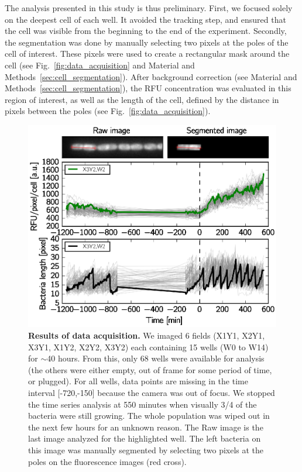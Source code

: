 The analysis presented in this study is thus preliminary.
First, we focused solely on the deepest cell of each well.
It avoided the tracking step, and ensured that the cell was visible from the beginning to the end of the experiment.
Secondly, the segmentation was done by manually selecting two pixels at the poles of the cell of interest.
These pixels were used to create a rectangular mask around the cell (see Fig.~\ref{fig:data_acquisition} and Material and Methods~\ref{sec:cell_segmentation}).
After background correction (see Material and Methods~\ref{sec:cell_segmentation}), the RFU concentration was evaluated in this region of interest, as well as the length of the cell, defined by the distance in pixels between the poles (see Fig.~\ref{fig:data_acquisition}).

\begin{figure}[p]
\centering
\includegraphics[scale=1]{./Fig/data_acquisition}
\caption{
\textbf{Results of data acquisition.}
We imaged 6 fields (X1Y1, X2Y1, X3Y1, X1Y2, X2Y2, X3Y2) each containing 15 wells (W0 to W14) for $\sim$40 hours.
From this, only 68 wells were available for analysis (the others were either empty, out of frame for some period of time, or plugged).
For all wells, data points are missing in the time interval [-720,-150] because the camera was out of focus.
We stopped the time series analysis at 550 minutes when visually 3/4 of the bacteria were still growing.
The whole population was wiped out in the next few hours for an unknown reason.
The Raw image is the last image analyzed for the highlighted well.
The left bacteria on this image was manually segmented by selecting two pixels at the poles on the fluorescence images (red cross).
}
\end{figure}
